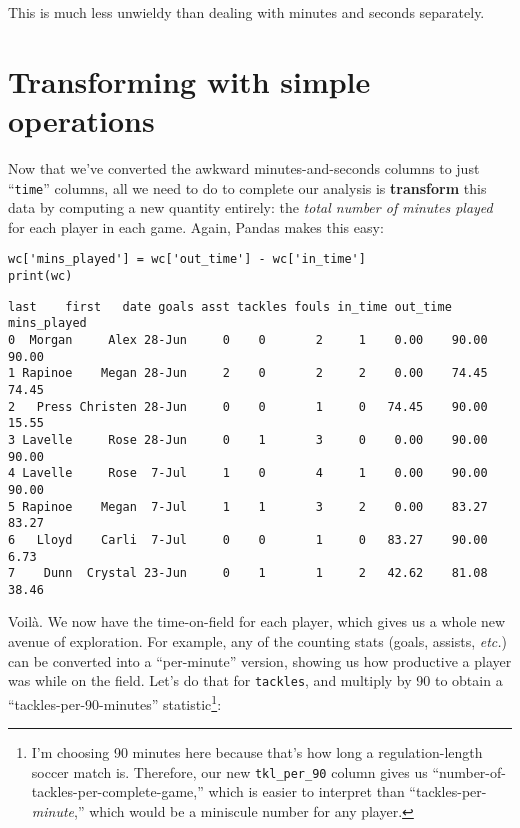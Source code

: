 This is much less unwieldy than dealing with minutes and seconds separately.

\section{Transforming with simple operations}



Now that we've converted the awkward minutes-and-seconds columns to just
``\texttt{time}'' columns, all we need to do to complete our analysis is
\textbf{transform} this data by computing a new quantity entirely: the
\textit{total number of minutes played} for each player in each game. Again,
Pandas makes this easy:

\begin{Verbatim}[fontsize=\small,samepage=true,frame=single,framesep=3mm]
wc['mins_played'] = wc['out_time'] - wc['in_time']
print(wc)
\end{Verbatim}
\vspace{-.2in}

\begin{Verbatim}[fontsize=\footnotesize,samepage=true,frame=leftline,framesep=5mm,framerule=1mm]
     last    first   date goals asst tackles fouls in_time out_time mins_played
0  Morgan     Alex 28-Jun     0    0       2     1    0.00    90.00       90.00
1 Rapinoe    Megan 28-Jun     2    0       2     2    0.00    74.45       74.45
2   Press Christen 28-Jun     0    0       1     0   74.45    90.00       15.55
3 Lavelle     Rose 28-Jun     0    1       3     0    0.00    90.00       90.00
4 Lavelle     Rose  7-Jul     1    0       4     1    0.00    90.00       90.00
5 Rapinoe    Megan  7-Jul     1    1       3     2    0.00    83.27       83.27
6   Lloyd    Carli  7-Jul     0    0       1     0   83.27    90.00        6.73
7    Dunn  Crystal 23-Jun     0    1       1     2   42.62    81.08       38.46
\end{Verbatim}


Voil\`{a}. We now have the time-on-field for each player, which gives us a
whole new avenue of exploration. For example, any of the counting stats (goals,
assists, \textit{etc.}) can be converted into a ``per-minute'' version, showing
us how productive a player was while on the field. Let's do that for
\texttt{tackles}, and multiply by 90 to obtain a ``tackles-per-90-minutes''
statistic\footnote{I'm choosing 90 minutes here because that's how long a
regulation-length soccer match is. Therefore, our new \texttt{tkl\_per\_90}
column gives us ``number-of-tackles-per-complete-game,'' which is easier to
interpret than ``tackles-per-\textit{minute},'' which would be a miniscule
number for any player.}:

